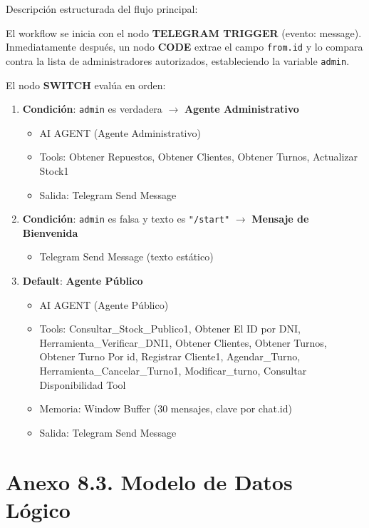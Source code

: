 \documentclass[12pt,a4paper]{report}
\begin{document}
Descripción estructurada del flujo principal:

El workflow se inicia con el nodo \textbf{TELEGRAM TRIGGER} (evento: message). Inmediatamente después, un nodo \textbf{CODE} extrae el campo \texttt{from.id} y lo compara contra la lista de administradores autorizados, estableciendo la variable \texttt{admin}.

El nodo \textbf{SWITCH} evalúa en orden:

\begin{enumerate}
  \item \textbf{Condición}: \texttt{admin} es verdadera $\rightarrow$ \textbf{Agente Administrativo}
        \begin{itemize}
          \item AI AGENT (Agente Administrativo)
          \item Tools: Obtener Repuestos, Obtener Clientes, Obtener Turnos, Actualizar Stock1
          \item Salida: Telegram Send Message
        \end{itemize}
  \item \textbf{Condición}: \texttt{admin} es falsa y texto es \texttt{"/start"} $\rightarrow$ \textbf{Mensaje de Bienvenida}
        \begin{itemize}
          \item Telegram Send Message (texto estático)
        \end{itemize}
  \item \textbf{Default}: \textbf{Agente Público}
        \begin{itemize}
          \item AI AGENT (Agente Público)
          \item Tools: Consultar\_Stock\_Publico1, Obtener El ID por DNI, Herramienta\_Verificar\_DNI1, Obtener Clientes, Obtener Turnos, Obtener Turno Por id, Registrar Cliente1, Agendar\_Turno, Herramienta\_Cancelar\_Turno1, Modificar\_turno, Consultar Disponibilidad Tool
          \item Memoria: Window Buffer (30 mensajes, clave por chat.id)
          \item Salida: Telegram Send Message
        \end{itemize}
\end{enumerate}

\section*{Anexo 8.3. Modelo de Datos Lógico}
\end{document}
